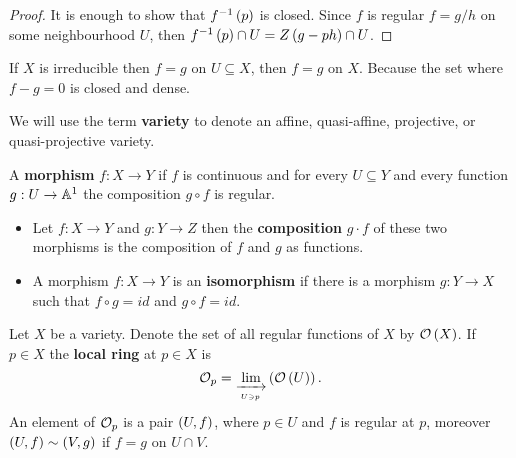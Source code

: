 \begin{proof}
It is enough to show that $ f^{-1}\left( p \right) $ is closed. Since $ f $ is regular $ f = g / h $ on some neighbourhood $ U $, then $ f^{-1}\left( p \right) \cap U = Z\left( g - ph \right) \cap U $.
\end{proof}

\begin{remark}
If $ X $ is irreducible then $ f = g $ on $ U \subseteq X $, then $ f = g $ on $ X $. Because the set where $ f - g = 0 $ is closed and dense.
\end{remark}

\begin{definition}
We will use the term \textbf{variety} to denote an affine, quasi-affine, projective, or quasi-projective variety.
\end{definition}

\begin{definition}
A \textbf{morphism} $ f : X \to Y $ if $ f $ is continuous and for every $ U \subseteq Y $ and every function $ g : U \to \mathbb{A}^1 $ the composition $ g \circ f $ is regular.
\end{definition}

\begin{remark}
\hfill
\begin{itemize}
\item Let $ f : X \to Y $ and $ g : Y \to Z $ then the \textbf{composition} $ g \cdot f $ of these two morphisms is the composition of $ f $ and $ g $ as functions.
\item A morphism $ f : X \to Y $ is an \textbf{isomorphism} if there is a morphism $ g : Y \to X $ such that $ f \circ g = id $ and $ g \circ f = id $.
\end{itemize}
\end{remark}

\begin{definition}
Let $ X $ be a variety. Denote the set of all regular functions of $ X $ by $ \mathcal{O}\left( X \right) $. If $ p \in X $ the \textbf{local ring} at $ p \in X $ is
$$ \mathcal{O}_p = \lim_{\xrightarrow[U \ni p]{}}\left( \mathcal{O}\left( U \right) \right). $$
An element of $ \mathcal{O}_p $ is a pair $ \left( U, f \right) $, where $ p \in U $ and $ f $ is regular at $ p $, moreover $ \left( U, f \right) \sim \left( V, g \right) $ if $ f = g $ on $ U \cap V $.
\end{definition}

